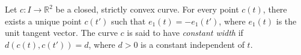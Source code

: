 Let $c: I \to \mathbb{R}^2$ be a closed, strictly convex curve. For every point $c(t)$, there exists a unique point $c(t')$ such that $e_1(t) = -e_1(t')$, where $e_1(t)$ is the unit tangent vector. The curve $c$ is said to have \emph{constant width} if $d(c(t), c(t')) = d$, where $d > 0$ is a constant independent of $t$.
